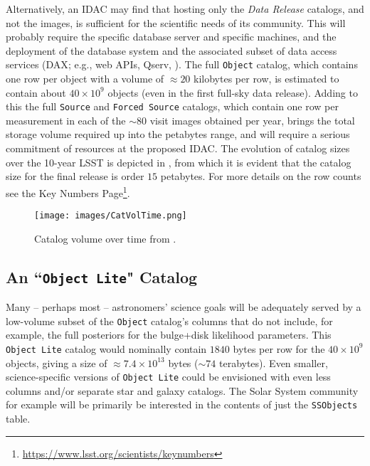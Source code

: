 Alternatively, an \gls{IDAC} may find that hosting only the {\it Data Release} catalogs, and not the images, is sufficient for the scientific needs of its community. This will probably require the specific \RO database server  and specific machines, and the deployment of the database system and the associated subset of data access services (\gls{DAX}; e.g., web APIs, \gls{Qserv}, ). The full {\tt Object} catalog, which contains one row per object with a volume of $\approx 20$ kilobytes per row, is estimated to contain about $40 \times 10^9$ objects (even in the first full-sky data release). Adding to this the full {\tt Source} and {\tt Forced Source} catalogs, which contain one row per measurement in each of the $\sim80$ visit images obtained per year, brings the total storage volume required up into the petabytes range, and will require a serious commitment of resources at the proposed \gls{IDAC}. The evolution of catalog sizes over the 10-year \gls{LSST} is depicted in , from which it is evident that the catalog size for the final release is order $15$ petabytes. For more details on the row counts see the Key Numbers Page\footnote{\url{https://www.lsst.org/scientists/keynumbers}}.

\begin{figure}
\begin{center}
\texttt{[image: images/CatVolTime.png]}
\caption{Catalog volume over time from . \label{fig:catvol}}
\end{center}
\end{figure}

\subsection{An ``{\tt \gls{Object} Lite}" Catalog}\label{sec:lite}

Many -- perhaps most -- astronomers' science goals will be adequately served by a low-volume subset of the {\tt \gls{Object}} catalog's columns that do not include, for example, the full posteriors for the bulge+disk likelihood parameters.
This {\tt \gls{Object} Lite} catalog would nominally contain $1840$ bytes per row for the $40 \times 10^{9}$ objects, giving a size of $\approx 7.4 \times 10^{13}$ bytes ($\sim74$ terabytes).
Even smaller, science-specific versions of {\tt \gls{Object} Lite} could be envisioned with even less columns and/or separate star and galaxy catalogs.
The Solar System community for example will be primarily be interested in the contents of  just the  {\tt SSObjects} table.

